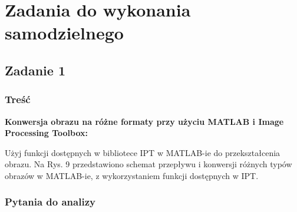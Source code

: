 \section{Zadania do wykonania samodzielnego}

\subsection{Zadanie 1}

\subsubsection{Treść}
\textbf{Konwersja obrazu na różne formaty przy użyciu MATLAB i Image Processing Toolbox:}

Użyj funkcji dostępnych w bibliotece IPT w MATLAB-ie do przekształcenia obrazu. Na Rys. 9
przedstawiono schemat przepływu i konwersji różnych typów obrazów w MATLAB-ie,
z wykorzystaniem funkcji dostępnych w IPT.

\subsubsection{Pytania do analizy}

